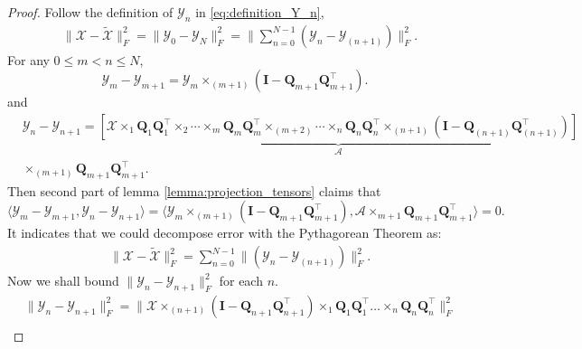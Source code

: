 \begin{lem}
\begin{proof}
Follow the definition of $\mathscr{Y}_n$ in \ref{eq:definition_Y_n}, 
\begin{equation}\label{eq: y_diff}
\begin{aligned}
& \|\mathscr{X}-\tilde{\mathscr{X}}\|_F^2 = \|\mathscr{Y}_0 - \mathscr{Y}_N\|_F^2= \|\sum_{n=0}^{N-1} (\mathscr{Y}_n - \mathscr{Y}_{(n+1)})\|_F^2.
\end{aligned}
\end{equation}
For any $0\le m< n\le N$, 
\begin{equation}
\mathscr{Y}_m-\mathscr{Y}_{m+1} = \mathscr{Y}_{m} \times_{(m+1)} (\mathbf{I} - \mathbf{Q}_{m+1}\mathbf{Q}^\top_{m+1}). 
\end{equation}
and 
\begin{equation}
\begin{aligned}
&\mathscr{Y}_n - \mathscr{Y}_{n+1}  = \underbrace{\left[\mathscr{X}\times_1 \mathbf{Q}_{1}\mathbf{Q}^\top_{1} \times_2 \cdots \times_{m} \mathbf{Q}_{m}\mathbf{Q}^\top_{m}\times_{(m+2)} \cdots  \times_{n} \mathbf{Q}_{n}\mathbf{Q}^\top_{n}\times_{(n+1)}(\mathbf{I}-\mathbf{Q}_{(n+1)}\mathbf{Q}^\top_{(n+1)})\right]}_{\mathscr{A}}\\
&\times_{(m+1)} \mathbf{Q}_{m+1}\mathbf{Q}^\top_{m+1}.
\end{aligned}
\end{equation}
Then second part of lemma \ref{lemma:projection_tensors} claims that 
\begin{equation}
\langle\mathscr{Y}_m-\mathscr{Y}_{m+1},  \mathscr{Y}_n - \mathscr{Y}_{n+1}\rangle = \langle\mathscr{Y}_{m} \times_{(m+1)} (\mathbf{I} - \mathbf{Q}_{m+1}\mathbf{Q}^\top_{m+1}), \mathscr{A} \times_{m+1} \mathbf{Q}_{m+1}\mathbf{Q}^\top_{m+1} \rangle = 0.
\end{equation}
It indicates that we could decompose error with the Pythagorean Theorem as:  
\begin{equation}
\label{eq:comression_decomposition}
\begin{aligned}
& \|\mathscr{X}-\tilde{\mathscr{X}}\|_F^2 =  \sum_{n=0}^{N-1} \| (\mathscr{Y}_n - \mathscr{Y}_{(n+1)})\|_F^2.
\end{aligned}
\end{equation}
Now we shall bound $\|\mathscr{Y}_n - \mathscr{Y}_{n+1}\|_F^2$ for each $n$.   
\begin{equation} \label{eq: y_diff_bound}
\begin{aligned}
&\|\mathscr{Y}_n - \mathscr{Y}_{n+1}\|_F^2 = \|\mathscr{X}\times_{(n+1)} (\mathbf{I} - \mathbf{Q}_{n+1}\mathbf{Q}_{n+1}^\top)\times_{1} \mathbf{Q}_{1}\mathbf{Q}_{1}^\top\dots \times_n \mathbf{Q}_{n}\mathbf{Q}_{n}^\top\|_F^2 \\

\end{aligned}
\end{equation}
\end{proof}
\end{lem}
